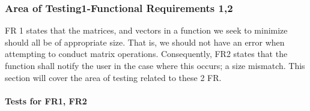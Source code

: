 \documentclass[12pt, titlepage]{article}
\begin{document}
\subsubsection{Area of Testing1-Functional Requirements 1,2}
FR 1 states that the matrices, and vectors in a function we seek to minimize should all be
of appropriate size. That is, we should not have an error when attempting to conduct matrix 
operations. Consequently, FR2 states that the function shall notify the user in the case where 
this occurs; a size mismatch. This section will cover the area of testing related to these 2 FR. 

		
\paragraph{Tests for FR1, FR2}
\end{document}
